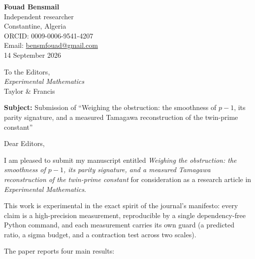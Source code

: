 \documentclass[11pt,a4paper]{article}
\begin{document}
\begin{flushright}
\textbf{Fouad Bensmail}\\
Independent researcher\\
Constantine, Algeria\\
ORCID: 0009-0006-9541-4207\\
Email: \href{mailto:bensmfouad@gmail.com}{bensmfouad@gmail.com}\\[0.5em]
14 September 2026
\end{flushright}

\vspace{1em}

\noindent To the Editors,\\
\textit{Experimental Mathematics}\\
Taylor \& Francis

\vspace{1.5em}

\noindent \textbf{Subject:} Submission of ``Weighing the obstruction: the smoothness of $p-1$, its parity signature, and a measured Tamagawa reconstruction of the twin-prime constant''

\vspace{1em}

\noindent Dear Editors,

I am pleased to submit my manuscript entitled \emph{Weighing the obstruction: the smoothness of $p-1$, its parity signature, and a measured Tamagawa reconstruction of the twin-prime constant} for consideration as a research article in \emph{Experimental Mathematics}.

This work is experimental in the exact spirit of the journal's manifesto: every claim is a high-precision measurement, reproducible by a single dependency-free Python command, and each measurement carries its own guard (a predicted ratio, a sigma budget, and a contraction test across two scales).

The paper reports four main results:
\end{document}
